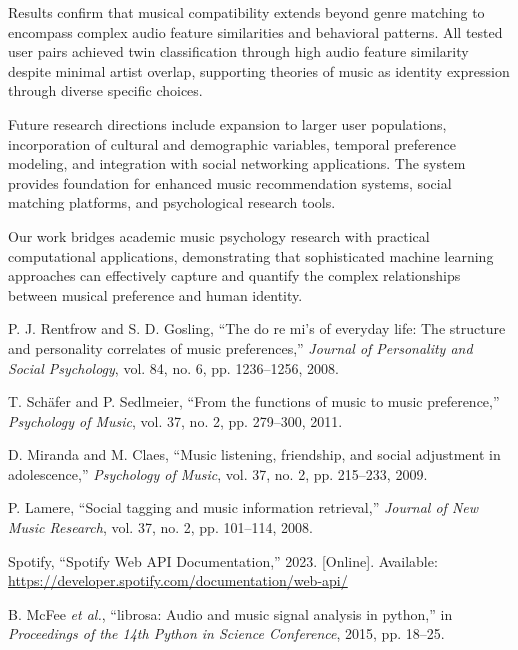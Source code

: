 \documentclass[conference]{IEEEtran}
\begin{document}
Results confirm that musical compatibility extends beyond genre matching to encompass complex audio feature similarities and behavioral patterns. All tested user pairs achieved twin classification through high audio feature similarity despite minimal artist overlap, supporting theories of music as identity expression through diverse specific choices.

Future research directions include expansion to larger user populations, incorporation of cultural and demographic variables, temporal preference modeling, and integration with social networking applications. The system provides foundation for enhanced music recommendation systems, social matching platforms, and psychological research tools.

Our work bridges academic music psychology research with practical computational applications, demonstrating that sophisticated machine learning approaches can effectively capture and quantify the complex relationships between musical preference and human identity.

\begin{thebibliography}{00}
 P. J. Rentfrow and S. D. Gosling, ``The do re mi's of everyday life: The structure and personality correlates of music preferences,'' \textit{Journal of Personality and Social Psychology}, vol. 84, no. 6, pp. 1236--1256, 2008.

 T. Schäfer and P. Sedlmeier, ``From the functions of music to music preference,'' \textit{Psychology of Music}, vol. 37, no. 2, pp. 279--300, 2011.

 D. Miranda and M. Claes, ``Music listening, friendship, and social adjustment in adolescence,'' \textit{Psychology of Music}, vol. 37, no. 2, pp. 215--233, 2009.

 P. Lamere, ``Social tagging and music information retrieval,'' \textit{Journal of New Music Research}, vol. 37, no. 2, pp. 101--114, 2008.

 Spotify, ``Spotify Web API Documentation,'' 2023. [Online]. Available: \url{https://developer.spotify.com/documentation/web-api/}

 B. McFee \textit{et al.}, ``librosa: Audio and music signal analysis in python,'' in \textit{Proceedings of the 14th Python in Science Conference}, 2015, pp. 18--25.
\end{thebibliography}
\end{document}
